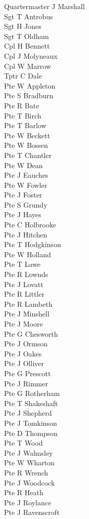 \begin{multicols}{3}
  \small
  \noindent
  Quartermaster J Marshall \\
  Sgt T Antrobus \\
  Sgt H Jones \\
  Sgt T Oldham \\
  Cpl H Bennett \\
  Cpl J Molyneaux \\
  Cpl W Marrow \\
  Tptr C Dale \\
  Pte W Appleton \\
  Pte S Bradburn \\
  Pte R Bate \\
  Pte T Birch \\
  Pte T Barlow \\
  Pte W Beckett \\
  Pte W Bossen \\
  Pte T Chantler \\
  Pte W Dean \\
  Pte J Eauches \\
  Pte W Fowler \\
  Pte J Foster \\
  Pte S Grundy \\
  Pte J Hayes \\
  Pte C Holbrooke \\
  Pte J Hitchen \\
  Pte T Hodgkinson \\
  Pte W Holland \\
  Pte T Lawe \\
  Pte R Lownds \\
  Pte J Lovatt \\
  Pte R Littler \\
  Pte R Lambeth \\
  Pte J Minshell \\
  Pte J Moore \\
  Pte G Chesworth \\
  Pte J Ormson \\
  Pte J Oakes \\
  Pte J Olliver \\
  Pte G Prescott \\
  Pte J Rimmer \\
  Pte G Rotherham \\
  Pte T Shakeshaft \\
  Pte J Shepherd \\
  Pte J Tomkinson \\
  Pte D Thompson \\
  Pte T Wood \\
  Pte J Walmsley \\
  Pte W Wharton \\
  Pte R Wrench \\
  Pte J Woodcock \\
  Pte R Heath \\
  Pte J Roylance \\
  Pte J Ravenscroft \\
\end{multicols}

